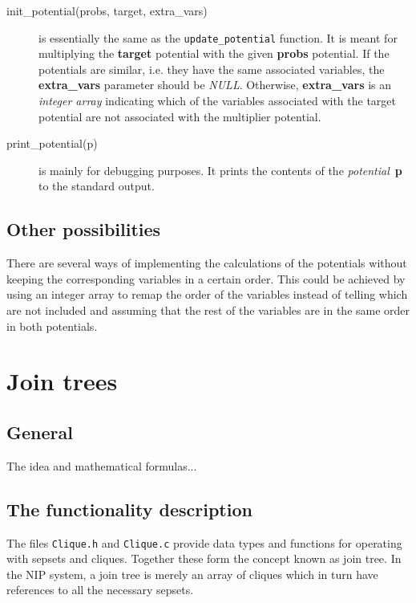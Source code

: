\documentclass[12pt,a4paper]{report}
\newcommand{\cdatatype}[1]{{\it #1}}
\newcommand{\cfilename}[1]{\texttt{#1}}
\newcommand{\cparameter}[1]{\textbf{#1}}
\newcommand{\cfunction}[1]{\texttt{#1}}
\begin{document}
\begin{description}
\item[init\_potential(probs, target, extra\_vars)] is essentially the
same as the \cfunction{update\_potential} function. It is meant for
multiplying the \cparameter{target} potential with the given
\cparameter{probs} potential. If the potentials are similar, i.e. they
have the same associated variables, the \cparameter{extra\_vars} parameter 
should be \cdatatype{NULL}. Otherwise, \cparameter{extra\_vars} is an 
\cdatatype{integer array} indicating which of the variables associated 
with the target potential are not associated with the multiplier potential.

\item[print\_potential(p)] is mainly for debugging purposes. It prints 
the contents of the \cdatatype{potential}~\cparameter{p} to the 
standard output.
\end{description}


\subsection{Other possibilities}
There are several ways of implementing the calculations of the potentials
without keeping the corresponding variables in a certain order. This
could be achieved by using an integer array to remap the order of the
variables instead of telling which are not included and assuming that
the rest of the variables are in the same order in both potentials.


\newpage
\section{Join trees} %
\subsection{General}

The idea and mathematical formulas...


\subsection{The functionality description}
The files \cfilename{Clique.h} and \cfilename{Clique.c} provide data 
types and functions for operating with sepsets and cliques. Together 
these form the concept known as join tree. In the NIP system, a join 
tree is merely an array of cliques which in turn have references to
all the necessary sepsets.
\end{document}
